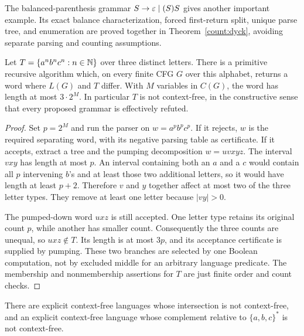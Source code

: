 The balanced-parenthesis grammar $S\to\varepsilon\mid(S)S$ gives another
important example.  Its exact balance characterization, forced first-return
split, unique parse tree, and enumeration are proved together in
Theorem~\ref{count:dyck}, avoiding separate parsing and counting assumptions.

\begin{theorem}
\label{cf:abc-separator}
Let $T=\{a^n b^n c^n:n\in\mathbb N\}$ over three distinct letters.  There is a
primitive recursive algorithm which, on every finite CFG $G$ over this
alphabet, returns a word where $L(G)$ and $T$ differ.  With $M$ variables
in $C(G)$, the word has length at most $3\cdot2^M$.  In particular $T$
is not context-free, in the constructive sense that every proposed
grammar is effectively refuted.
\end{theorem}

\begin{proof}
Set $p=2^M$ and run the parser on $w=a^p b^p c^p$.  If it rejects, $w$ is
the required separating word, with its negative parsing table as
certificate.  If it accepts, extract a tree and the pumping decomposition
$w=uvxyz$.  The interval $vxy$ has length at most $p$.  An interval
containing both an $a$ and a $c$ would contain all $p$ intervening $b$'s
and at least those two additional letters, so it would have length at
least $p+2$.  Therefore $v$ and $y$ together affect at most two of the
three letter types.  They remove at least one letter because $|vy|>0$.

The pumped-down word $uxz$ is still accepted.  One letter type retains
its original count $p$, while another has smaller count.  Consequently
the three counts are unequal, so $uxz\notin T$.  Its length is at most
$3p$, and its acceptance certificate is supplied by pumping.  These two
branches are selected by one Boolean computation, not by excluded
middle for an arbitrary language predicate.  The membership and
nonmembership assertions for $T$ are just finite order and count checks.
\end{proof}

\begin{theorem}
\label{cf:nonclosures}
There are explicit context-free languages whose intersection is not
context-free, and an explicit context-free language whose complement
relative to $\{a,b,c\}^*$ is not context-free.
\end{theorem}

